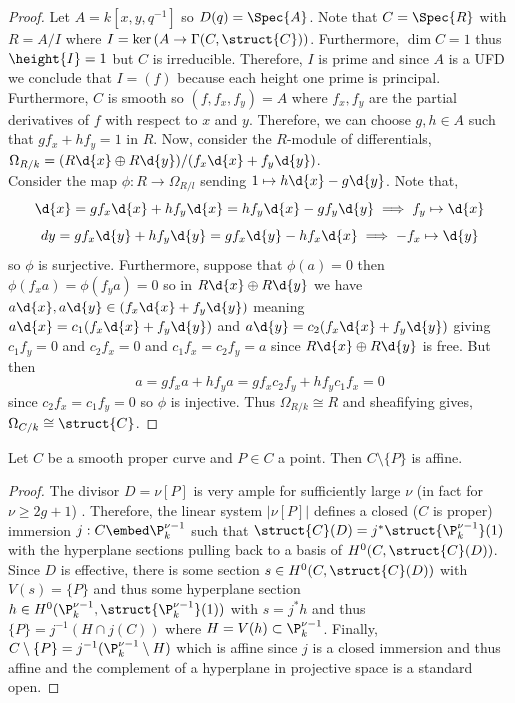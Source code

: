 \begin{proof}
Let $A = k[x, y, q^{-1}]$ so $D(q) = \Spec{A}$. Note that $C = \Spec{R}$ with $R = A/I$ where $I = \ker{(A \to \Gamma(C, \struct{C}))}$. Furthermore, $\dim{C} = 1$ thus $\height{I} = 1$ but $C$ is irreducible. Therefore, $I$ is prime and since $A$ is a UFD we conclude that $I = (f)$ because each height one prime is principal. Furthermore, $C$ is smooth so $(f, f_x, f_y) = A$ where $f_x, f_y$ are the partial derivatives of $f$ with respect to $x$ and $y$. Therefore, we can choose $g,h \in A$ such that $g f_x + h f_y = 1$ in $R$. Now, consider the $R$-module of differentials, $\Omega_{R/k} = (R \d{x} \oplus R \d{y}) /(f_x \d{x} + f_y \d{y})$. 
\bigskip\\
Consider the map $\phi : R \to \Omega_{R/l}$ sending $1 \mapsto h \d{x} - g \d{y}$. Note that,
\[ \d{x} = g f_x \d{x} + h f_y \d{x} = h f_y \d{x} - g f_y \d{y} \implies f_y \mapsto \d{x} \] 
\[ d{y} = g f_x \d{y} + h f_y \d{y} = g f_x \d{y} - h f_x \d{x} \implies -f_x \mapsto \d{y} \]
so $\phi$ is surjective. Furthermore, suppose that $\phi(a) = 0$ then $\phi(f_x a) = \phi(f_y a) = 0$ so in $R \d{x} \oplus R \d{y}$ we have $a \d{x}, a \d{y} \in (f_x \d{x} + f_y \d{y})$  meaning $a \d{x} = c_1(f_x \d{x} + f_y \d{y})$ and $a \d{y} = c_2(f_x \d{x} + f_y \d{y})$ giving $c_1 f_y = 0$ and $c_2 f_x = 0$ and $c_1 f_x = c_2 f_y = a$ since $R \d{x} \oplus R \d{y}$ is free. But then \[ a = g f_x a + h f_y a = g f_x c_2 f_y + h f_y c_1 f_x = 0 \]
since $c_2 f_x = c_1 f_y = 0$ so $\phi$ is injective. Thus $\Omega_{R/k} \cong R$ and sheafifying gives, $\Omega_{C/k} \cong \struct{C}$. 
\end{proof}

\begin{lemma} \label{affine_remove_point}
Let $C$ be a smooth proper curve and $P \in C$ a point. Then $C \setminus \{ P \}$ is affine. 
\end{lemma}

\begin{proof}
The divisor $D = \nu [P]$ is very ample for sufficiently large $\nu$ (in fact for $\nu \ge 2 g + 1$) \cite[Thm. IV.3.2]{har}. Therefore, the linear system $|\nu [P]|$ defines a closed ($C$ is proper) immersion $j : C \embed \P^{\nu - 1}_k$ such that $\struct{C}(D) = j^* \struct{\P^{\nu-1}_k}(1)$ with the hyperplane sections pulling back to a basis of $H^0(C, \struct{C}(D))$. Since $D$ is effective, there is some section $s \in H^0(C, \struct{C}(D))$ with $V(s) = \{ P \}$ and thus some hyperplane section $h \in H^0(\P^{\nu - 1}_k, \struct{\P^{\nu-1}_k}(1))$ with $s = j^* h$ and thus $\{ P \} = j^{-1}(H \cap j(C))$ where $H = V(h) \subset \P^{\nu - 1}_k$. Finally, $C  \setminus \{ P \} = j^{-1}(\P^{\nu - 1}_k \setminus H)$ which is affine since $j$ is a closed immersion and thus affine and the complement of a hyperplane in projective space is a standard open.
\end{proof}


